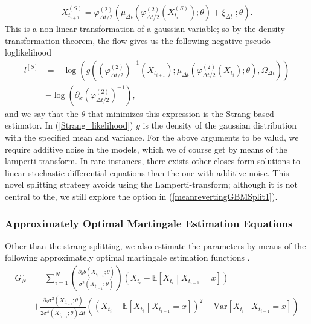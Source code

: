 \begin{align}
    X_{t_{i+1}}^{(S)} = \varphi_{\Delta t / 2}^{(2)}\left(\mu_{\Delta t}\left(\varphi_{\Delta t/2}^{(2)}\left(X_{t_{i}}^{(S)}\right); \theta\right) + \xi_{\Delta t} \; ; \theta \right).
\end{align}
This is a non-linear transformation of a gaussian variable; so by the density transformation theorem, the flow gives us the following negative pseudo-loglikelihood 
\begin{align}
    l^{[S]} &= -\log\left(g\left(\left(\varphi_{\Delta t / 2}^{(2)}\right)^{-1}\left(X_{t_{i+1}}\right); \mu_{\Delta t}\left(\varphi_{\Delta t/2}^{(2)}\left(X_{t_{i}}\right); \theta \right), \Omega_{\Delta t} \right) \right) \nonumber \\
    &- \log\left(\partial_x \left(\varphi_{\Delta t / 2}^{(2)}\right)^{-1} \right), \label{Strang_likelihood}
\end{align}
and we say that the $\theta$ that minimizes this expression is the Strang-based estimator. In (\ref{Strang_likelihood}) $g$ is the density of the gaussian distribution with the specified mean and variance. For the above arguments to be valud, we require additive noise in the models, which we of course get by means of the lamperti-transform. In rare instances, there exists other closes form solutions to linear stochastic differential equations than the one with additive noise. This novel splitting strategy avoids using the Lamperti-transform; although it is not central to the, we still explore the option in (\ref{meanrevertingGBMSplit1}).
\subsubsection{Approximately Optimal Martingale Estimation Equations}
Other than the strang splitting, we also estimate the parameters by means of the following approximately optimal martingale estimation functions \cite[Example 1.11]{StatisticalMethodsForSDE}.
\begin{align}
    G_N^{\circ} &= \sum_{i = 1}^N 
    \left(
        \frac{\partial_\theta b\left(X_{t_{i-1}};\theta\right)}{\sigma^2\left(X_{t_{i-1}};\theta\right)}
    \right) \left(X_{t_{i}} - \mathbb{E}\left[X_{t_{i}} \middle| X_{t_{i-1}} = x\right]\right) \nonumber \\
    &+ \frac{\partial_\theta\sigma^2\left(X_{t_{i-1}}; \theta\right)}{2\sigma^4\left(X_{t_{i - 1}}; \theta\right)\Delta t}\left(\left(X_{t_{i}} - \mathbb{E}\left[X_{t_{i}} \middle| X_{t_{i-1}} = x\right]\right)^2 - \textrm{Var}\left[X_{t_{i}} \middle| X_{t_{i-1}} = x\right]\right) \label{eq:approximatelyOptimalMartingale}
\end{align}

